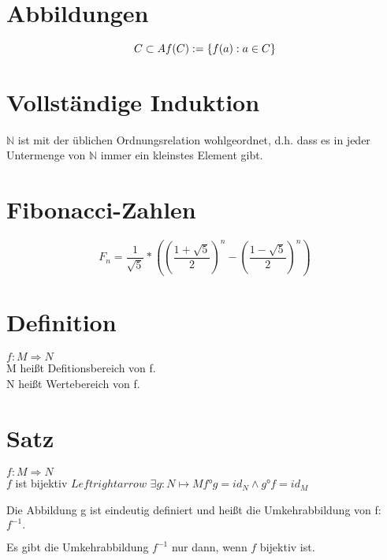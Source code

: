 \documentclass[a4paper,10pt]{article}
\title{}
\author{Marten Lienen}
\begin{document}
\maketitle

\section{Abbildungen}

\begin{equation}
 C \subset A\\
 f(C) := \{ f(a): a \in C \}
\end{equation}

\section{Vollständige Induktion}

$\mathbb{N}$ ist mit der üblichen Ordnungsrelation wohlgeordnet, d.h. dass es in jeder Untermenge von $\mathbb{N}$
immer ein kleinstes Element gibt.

\section{Fibonacci-Zahlen}

\begin{equation}
 F_n = \frac{1}{\sqrt{5}} * \left(\left(\frac{1 + \sqrt{5}}{2}\right)^n - \left(\frac{1 - \sqrt{5}}{2}\right)^n\right)
\end{equation}

\section{Definition}

$f: M \Rightarrow N$\\
M heißt Defitionsbereich von f.\\
N heißt Wertebereich von f.

\section{Satz}

$f: M \Rightarrow N$\\
$f$ ist bijektiv $Leftrightarrow$ $\exists g: N \mapsto M f°g = id_N \land g°f = id_M$

Die Abbildung g ist eindeutig definiert und heißt die Umkehrabbildung von f: $f^{-1}.$

Es gibt die Umkehrabbildung $f^{-1}$ nur dann, wenn $f$ bijektiv ist.
\end{document}
